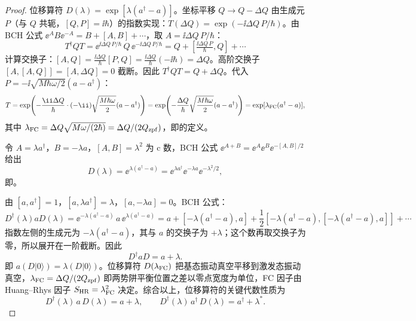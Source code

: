 \begin{proof}
位移算符 \(D(\lambda)=\exp[\lambda(a^\dagger-a)]\)。坐标平移 \(Q\to Q-\Delta Q\) 由生成元 \(P\)（与 \(Q\) 共轭，\([Q,P]=\ii\hbar\)）的指数实现：\(T(\Delta Q)=\exp(-\ii\Delta Q\,P/\hbar)\)。由 BCH 公式 \(\ee^A B\ee^{-A}=B+[A,B]+\cdots\)，取 \(A=\ii\Delta Q\,P/\hbar\)：
\begin{equation*}
T^\dagger Q T=\ee^{\ii\Delta Q\,P/\hbar}\,Q\,\ee^{-\ii\Delta Q\,P/\hbar}=Q+[\tfrac{\ii\Delta Q\,P}{\hbar},Q]+\cdots
\end{equation*}
计算交换子：\([A,Q]=\frac{\ii\Delta Q}{\hbar}[P,Q]=\frac{\ii\Delta Q}{\hbar}(-\ii\hbar)=\Delta Q\)。高阶交换子 \([A,[A,Q]]=[A,\Delta Q]=0\) 截断。因此 \(T^\dagger Q T=Q+\Delta Q\)。代入 \(P=-\ii\sqrt{M\hbar\omega/2}(a-a^\dagger)\)：
\begin{equation*}
T=\exp\!\left(-\frac{\ii\Delta Q}{\hbar}\cdot(-\ii)\sqrt{\frac{M\hbar\omega}{2}}(a-a^\dagger)\right)
=\exp\!\left(-\frac{\Delta Q}{\hbar}\sqrt{\frac{M\hbar\omega}{2}}(a-a^\dagger)\right)
=\exp[\lambda_{\rm FC}(a^\dagger-a)],
\end{equation*}
其中 \(\lambda_{\rm FC}=\Delta Q\sqrt{M\omega/(2\hbar)}=\Delta Q/(2Q_{\rm zpf})\)，即的定义。

令 \(A=\lambda a^\dagger\)，\(B=-\lambda a\)，\([A,B]=\lambda^2\) 为 c 数，BCH 公式 \(\ee^{A+B}=\ee^A\ee^B\ee^{-[A,B]/2}\) 给出
\begin{equation*}
D(\lambda)=\ee^{\lambda(a^\dagger-a)}=\ee^{\lambda a^\dagger}\ee^{-\lambda a}\ee^{-\lambda^2/2},
\end{equation*}
即。

由 \([a,a^\dagger]=1\)，\([a,\lambda a^\dagger]=\lambda\)，\([a,-\lambda a]=0\)。BCH 公式：
\begin{equation*}
D^\dagger(\lambda)aD(\lambda)=\ee^{-\lambda(a^\dagger-a)}\,a\,\ee^{\lambda(a^\dagger-a)}
=a+[-\lambda(a^\dagger-a),a]+\frac{1}{2}[-\lambda(a^\dagger-a),[-\lambda(a^\dagger-a),a]]+\cdots
\end{equation*}
指数左侧的生成元为 $-\lambda(a^\dagger-a)$，其与 $a$ 的交换子为 $+\lambda$；这个数再取交换子为零，所以展开在一阶截断。因此
\begin{equation*}
D^\dagger a D=a+\lambda.
\end{equation*}
即 \(a(D|0\rangle)=\lambda(D|0\rangle)\)。位移算符 \(D(\lambda_{\rm FC})\) 把基态振动真空平移到激发态振动真空，\(\lambda_{\rm FC}=\Delta Q/(2Q_{\rm zpf})\) 即两势阱平衡位置之差以零点宽度为单位，FC 因子由 Huang--Rhys 因子 \(S_{\rm HR}=\lambda_{\rm FC}^2\) 决定。综合以上，位移算符的关键代数性质为
\begin{equation*}
D^\dagger(\lambda)\,a\,D(\lambda)=a+\lambda,\qquad D^\dagger(\lambda)\,a^\dagger\,D(\lambda)=a^\dagger+\lambda^*.
\end{equation*}

\end{proof}

